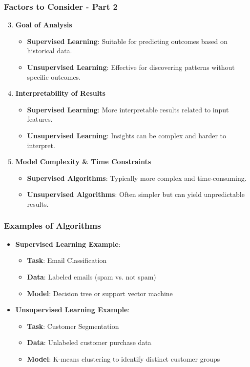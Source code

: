 \documentclass{beamer}
\begin{document}
\begin{frame}[fragile]
    \frametitle{Factors to Consider - Part 2}
    \begin{enumerate}\setcounter{enumi}{2}
        \item \textbf{Goal of Analysis}
        \begin{itemize}
            \item \textbf{Supervised Learning}: Suitable for predicting outcomes based on historical data.
            \item \textbf{Unsupervised Learning}: Effective for discovering patterns without specific outcomes.
        \end{itemize}
        
        \item \textbf{Interpretability of Results}
        \begin{itemize}
            \item \textbf{Supervised Learning}: More interpretable results related to input features.
            \item \textbf{Unsupervised Learning}: Insights can be complex and harder to interpret.
        \end{itemize}
        
        \item \textbf{Model Complexity \& Time Constraints}
        \begin{itemize}
            \item \textbf{Supervised Algorithms}: Typically more complex and time-consuming.
            \item \textbf{Unsupervised Algorithms}: Often simpler but can yield unpredictable results.
        \end{itemize}
    \end{enumerate}
\end{frame}

\begin{frame}[fragile]
    \frametitle{Examples of Algorithms}
    \begin{itemize}
        \item \textbf{Supervised Learning Example}:
        \begin{itemize}
            \item \textbf{Task}: Email Classification
            \item \textbf{Data}: Labeled emails (spam vs. not spam)
            \item \textbf{Model}: Decision tree or support vector machine
        \end{itemize}
        
        \item \textbf{Unsupervised Learning Example}:
        \begin{itemize}
            \item \textbf{Task}: Customer Segmentation
            \item \textbf{Data}: Unlabeled customer purchase data
            \item \textbf{Model}: K-means clustering to identify distinct customer groups
        \end{itemize}
    \end{itemize}
\end{frame}
\end{document}
